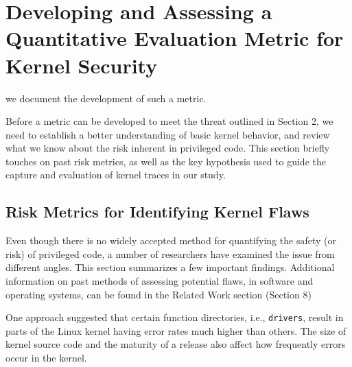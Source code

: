 \section{Developing and Assessing a Quantitative Evaluation Metric for Kernel Security}
\label{sec.metric}

we document the development of such a metric.


Before a metric can be developed to meet the threat outlined in Section 2, we need to
establish a better understanding of basic kernel behavior, and review what we know about
the risk inherent in privileged code. This section briefly touches on past risk
metrics, as well as the key hypothesis used to guide the capture and evaluation
of kernel traces in our study.

\subsection{Risk Metrics for Identifying Kernel Flaws}

Even though there is no widely accepted method for
quantifying the safety (or risk) of privileged code, a number of researchers have
examined the issue from different angles. This section summarizes a few important
findings. Additional information on past methods
of assessing potential flaws, in software and operating systems,
 can be found in the Related Work section (Section 8)


One approach \cite{PittSFIeld} suggested that certain function
directories, i.e., \texttt{drivers},
result in parts of the Linux kernel having error rates much higher than
others. The size of kernel source code and the maturity of a release also affect
how frequently errors occur in the kernel.

